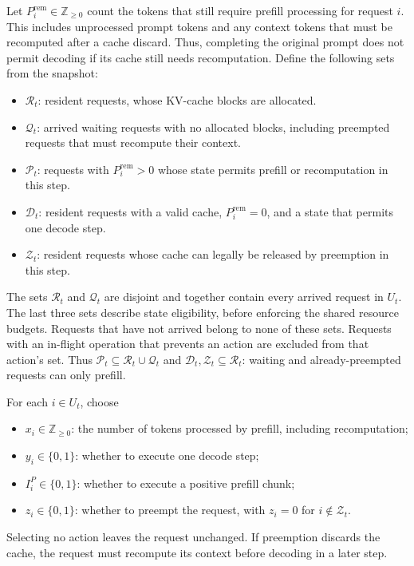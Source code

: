 \documentclass[11pt]{article}
\begin{document}
Let \(P_i^{\mathrm{rem}}\in\mathbb{Z}_{\ge0}\) count the tokens that still require prefill processing for request \(i\). This includes unprocessed prompt tokens and any context tokens that must be recomputed after a cache discard. Thus, completing the original prompt does not permit decoding if its cache still needs recomputation. Define the following sets from the snapshot:
\begin{itemize}
    \item \(\mathcal{R}_t\): resident requests, whose KV-cache blocks are allocated.
    \item \(\mathcal{Q}_t\): arrived waiting requests with no allocated blocks, including preempted requests that must recompute their context.
    \item \(\mathcal{P}_t\): requests with \(P_i^{\mathrm{rem}}>0\) whose state permits prefill or recomputation in this step.
    \item \(\mathcal{D}_t\): resident requests with a valid cache, \(P_i^{\mathrm{rem}}=0\), and a state that permits one decode step.
    \item \(\mathcal{Z}_t\): resident requests whose cache can legally be released by preemption in this step.
\end{itemize}
The sets \(\mathcal{R}_t\) and \(\mathcal{Q}_t\) are disjoint and together contain every arrived request in \(U_t\). The last three sets describe state eligibility, before enforcing the shared resource budgets. Requests that have not arrived belong to none of these sets. Requests with an in-flight operation that prevents an action are excluded from that action's set. Thus \(\mathcal{P}_t\subseteq\mathcal{R}_t\cup\mathcal{Q}_t\) and \(\mathcal{D}_t,\mathcal{Z}_t\subseteq\mathcal{R}_t\): waiting and already-preempted requests can only prefill.

For each \(i\in U_t\), choose
\begin{itemize}
    \item \(x_i\in\mathbb{Z}_{\ge0}\): the number of tokens processed by prefill, including recomputation;
    \item \(y_i\in\{0,1\}\): whether to execute one decode step;
    \item \(I_i^P\in\{0,1\}\): whether to execute a positive prefill chunk;
    \item \(z_i\in\{0,1\}\): whether to preempt the request, with \(z_i=0\) for \(i\notin\mathcal{Z}_t\).
\end{itemize}
Selecting no action leaves the request unchanged. If preemption discards the cache, the request must recompute its context before decoding in a later step.
\end{document}
